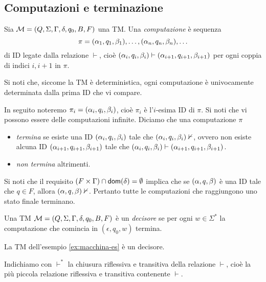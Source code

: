 \documentclass[runningheads,a4paper]{llncs}
\begin{document}
\subsection{Computazioni e terminazione}

\begin{definition}\label{def:computation}
Sia $\mathcal{M} = (Q,\Sigma,\Gamma,\delta,q_0,B,F)$ una TM. Una \emph{computazione} \`{e} sequenza
$$ \pi = (\alpha_1,q_1,\beta_1),\ldots,(\alpha_n,q_n,\beta_n),\ldots $$
di ID legate dalla relazione $\vdash$, cio\`{e} $(\alpha_i,q_i,\beta_i) \vdash (\alpha_{i+1},q_{i+1},\beta_{i+1})$ per ogni coppia di indici $i,i+1$ in $\pi$.
\end{definition}

Si noti che, siccome la TM \`{e} deterministica, ogni computazione \`{e} univocamente determinata dalla prima ID che vi compare.

In seguito noteremo $\pi_i = (\alpha_i,q_i,\beta_i)$, cio\`{e} $\pi_i$ \`{e} l'$i$-esima ID di $\pi$. Si noti che vi possono essere delle computazioni infinite. Diciamo che una computazione $\pi$ 
\begin{itemize}
\item \emph{termina} se esiste una ID $(\alpha_i,q_i,\beta_i)$ tale che $(\alpha_i,q_i,\beta_i) \nvdash$, ovvero non esiste alcuna ID $(\alpha_{i+1},q_{i+1},\beta_{i+1})$ tale che $(\alpha_i,q_i,\beta_i) \vdash (\alpha_{i+1},q_{i+1},\beta_{i+1})$.
\item \emph{non termina} altrimenti.
\end{itemize}

Si noti che il requisito $(F \times \Gamma) \cap \mathsf{dom}(\delta) = \emptyset$ implica che se $(\alpha,q,\beta)$ \`{e} una ID tale che $q \in F$, allora $(\alpha,q,\beta) \nvdash$. Pertanto tutte le computazioni che raggiungono uno stato finale terminano.

\begin{definition}[Decisore]\label{def:decisore}
Una TM $\mathcal{M} = (Q,\Sigma,\Gamma,\delta,q_0,B,F)$ \`{e} un \emph{decisore} se per ogni  $w \in \Sigma^*$ la computazione che comincia in $(\epsilon,q_0,w)$ termina.
\end{definition}

La TM dell'esempio \ref{ex:macchina-es} \`{e} un decisore.

Indichiamo con $\vdash^*$ la chiusura riflessiva e transitiva della relazione $\vdash$, cio\`{e} la pi\`{u} piccola relazione riflessiva e transitiva contenente $\vdash$.
\end{document}

